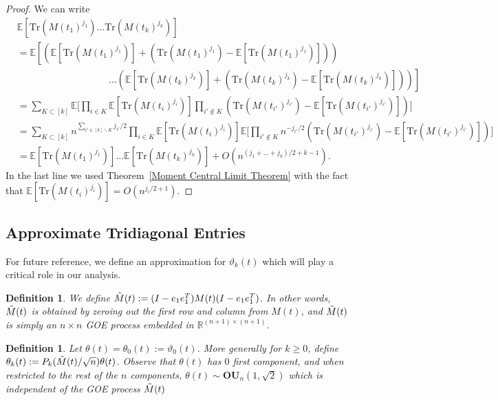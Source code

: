 \documentclass{amsart}
\newtheorem{defn}[thm]{Definition}
\numberwithin{equation}{section}
\newcommand{\E}{\mathbb{E}}
\newcommand{\R}{\mathbb{R}}
\begin{document}
\begin{proof}
    We can write
    \begin{align*}
        &\E\left[\mathrm{Tr}(M(t_1)^{j_1})\dots \mathrm{Tr}(M(t_k)^{j_k})\right] \\
        &= \E\left[\left(\E[\mathrm{Tr}(M(t_1)^{j_1})]+(\mathrm{Tr}(M(t_1)^{j_1})-\E[\mathrm{Tr}(M(t_1)^{j_1})])\right)\right.\\
        &\hspace{4cm}\dots\left.\left(\E[\mathrm{Tr}(M(t_k)^{j_k})]+(\mathrm{Tr}(M(t_k)^{j_k})-\E[\mathrm{Tr}(M(t_k)^{j_k})])\right)\right]\\
        &= \sum_{K \subset [k]} \E\bigg[\prod_{i \in K} \E[\mathrm{Tr}(M(t_i)^{j_i})] \prod_{i' \notin K} (\mathrm{Tr}(M(t_{i'})^{j_{i'}})-\E[\mathrm{Tr}(M(t_{i'})^{j_{i'}})])\bigg]\\
        &= \sum_{K \subset [k]} n^{\sum_{i' \in [k]\backslash K}j_{i'}/2}\prod_{i \in K} \E[\mathrm{Tr}(M(t_i)^{j_i})] \E\bigg[\prod_{i' \notin K} n^{-j_{i'}/2}(\mathrm{Tr}(M(t_{i'})^{j_{i'}})-\E[\mathrm{Tr}(M(t_{i'})^{j_{i'}})])\bigg]\\
        &= \E[\mathrm{Tr}(M(t_1)^{j_1})]...\E[\mathrm{Tr}(M(t_k)^{j_k})]+O(n^{(j_1+...+j_k)/2+k-1}).
    \end{align*}
    In the last line we used Theorem~\ref{Moment Central Limit Theorem} with the fact that $\E[\mathrm{Tr}(M(t_i)^{j_i})] = O(n^{j_i/2+1})$. 
\end{proof}

\subsection{Approximate Tridiagonal Entries}\label{Approximate thetas}
For future reference, we define an approximation for $\vartheta_k(t)$ which will play a critical role in our analysis.

\begin{defn}
    We define $\Tilde{M}(t):=(I-e_1  e_1^T)M(t)(I-e_1  e_1^T)$. In other words, $\Tilde{M}(t)$ is obtained by zeroing out the first row and column from $M(t)$, and $\Tilde{M}(t)$ is simply an $n\times n$ GOE process embedded in $\R^{(n+1) \times (n+1)}$. 
\end{defn}

\begin{defn}
    Let $\theta(t)=\theta_0(t):= \vartheta_0(t)$. More generally for $k \geq 0$, define $\theta_k(t):= P_k(\Tilde{M}(t)/\sqrt{n})\theta(t)$. Observe that $\theta(t)$ has $0$ first component, and when restricted to the rest of the $n$ components, $\theta(t) \sim \mathbf{OU}_{n}(1,\sqrt{2})$ which is independent of the GOE process $\Tilde{M}(t)$
\end{defn}
\end{document}
